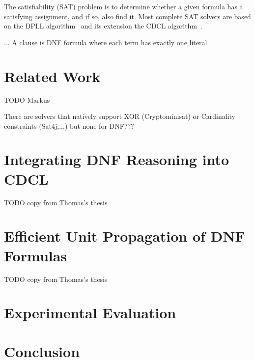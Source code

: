 \documentclass[a4paper,UKenglish,cleveref, autoref, thm-restate]{lipics-v2021}
\begin{document}
The satisfiability (SAT) problem is to determine whether a given formula has a satisfying assignment, and if so, also find it. Most complete SAT solvers are based on the DPLL algorithm~\cite{Davis.1962} and its extension the CDCL algorithm~\cite{MarquesSilva.1999,Moskewicz.2001}. 

... A clause is DNF formula where each term has exactly one literal

\section{Related Work}
TODO Markus

There are solvers that natively support XOR (Cryptominisat) or Cardinality constraints (Sat4j,...) but none for DNF???

\section{Integrating DNF Reasoning into CDCL}
TODO copy from Thomas's thesis

\section{Efficient Unit Propagation of DNF Formulas}
TODO copy from Thomas's thesis

\section{Experimental Evaluation}

\section{Conclusion}


\end{document}
